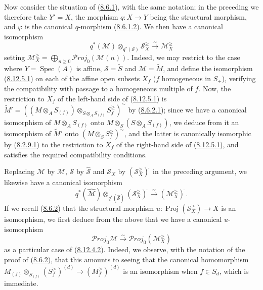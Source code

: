 \begin{env}[8.12.5]
\label{II.8.12.5}
Now consider the situation of (\hyperref[II.8.6.1]{8.6.1}),
with the same notation; in the preceding we therefore take $Y'=X$, the
morphism $q:X\to Y$ being the structural morphism, and $\varphi$ is the
canonical $q$-morphism (\hyperref[II.8.6.1.2]{8.6.1.2}). We then have a
canonical isomorphism
\begin{equation}
\label{II.8.12.5.1}
  q^*(\mathcal{M})\otimes_{q^*(\mathcal{S})}\mathcal{S}_X^{\geq}
  \xrightarrow{\sim}\mathcal{M}_X^{\geq}
\tag{8.12.5.1}
\end{equation}
setting
$\mathcal{M}_X^{\geq}=\bigoplus_{n\geq0}\mathcal{P}\mathit{roj}_0(\mathcal{M}(n))$.
Indeed, we may restrict to the case where $Y=\operatorname{Spec}(A)$ is
affine, $\mathcal{S}=\widetilde{S}$ and $\mathcal{M}=\widetilde{M}$, and
define the isomorphism (\hyperref[II.8.12.5.1]{8.12.5.1}) on each of the
affine open subsets $X_f$ ($f$ homogeneous in $S_+$), verifying the
compatibility with passage to a homogeneous multiple of $f$. Now, the
restriction to $X_f$ of the left-hand side of
(\hyperref[II.8.12.5.1]{8.12.5.1}) is
$\widetilde{M}'=
\left((M\otimes_A S_{(f)})
\otimes_{S\otimes_A S_{(f)}}S_f^{\geq}\right)^{\sim}$ by
(\hyperref[II.8.6.2.1]{8.6.2.1}); since we have a canonical isomorphism of
$M\otimes_A S_{(f)}$ onto $M\otimes_S(S\otimes_A S_{(f)})$, we deduce from
it an isomorphism of $\widetilde{M}'$ onto
$\left(M\otimes_S S_f^{\geq}\right)^{\sim}$, and the latter is
canonically isomorphic by (\hyperref[II.8.2.9.1]{8.2.9.1}) to the
restriction to $X_f$ of the right-hand side of
(\hyperref[II.8.12.5.1]{8.12.5.1}), and satisfies the required
compatibility conditions.

Replacing $\mathcal{M}$ by $\widehat{\mathcal{M}}$, $\mathcal{S}$ by
$\widehat{\mathcal{S}}$ and $\mathcal{S}_X$ by
$(\mathcal{S}_X^{\geq})^{\widehat{\,}}$ in the preceding argument, we likewise
have a canonical isomorphism
\begin{equation}
\label{II.8.12.5.2}
  q^*(\widehat{\mathcal{M}})
  \otimes_{q^*(\widehat{\mathcal{S}})}(\mathcal{S}_X^{\geq})^{\widehat{\,}}
  \xrightarrow{\sim}(\mathcal{M}_X^{\geq})^{\widehat{\,}}.
\tag{8.12.5.2}
\end{equation}
If we recall (\hyperref[II.8.6.2]{8.6.2}) that the structural morphism
$u:\operatorname{Proj}(\mathcal{S}_X^{\geq})\to X$ is an
isomorphism, we first deduce from the above that we have a canonical
$u$-isomorphism
\begin{equation}
\label{II.8.12.5.3}
  \mathcal{P}\mathit{roj}_0\mathcal{M}
  \xrightarrow{\sim}\mathcal{P}\mathit{roj}_0(\mathcal{M}_X^{\geq})
\tag{8.12.5.3}
\end{equation}
as a particular case of (\hyperref[II.8.12.4.2]{8.12.4.2}). Indeed, we
observe, with the notation of the proof of
(\hyperref[II.8.6.2]{8.6.2}), that this amounts to seeing that
the canonical homomorphism
$M_{(f)}\otimes_{S_{(f)}}(S_f^{\geq})^{(d)}\to(M_f^{\geq})^{(d)}$ is an
isomorphism when $f\in S_d$, which is immediate.


\end{env}
